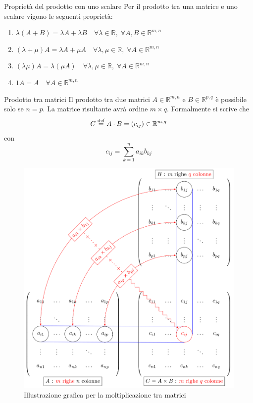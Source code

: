 \begin{SubDef}{Proprietà del prodotto con uno scalare}
  Per il prodotto tra una matrice e uno scalare vigono le seguenti proprietà:
  \begin{enumerate}
    \item $\lambda(A+B) = \lambda A + \lambda B\quad\forall\lambda\in\mathbb{R},\;
      \forall A,B\in\mathbb{R}^{m,n}$
    \item $(\lambda+\mu)A = \lambda A + \mu A\quad\forall\lambda,\mu\in\mathbb{R},\;
      \forall A\in\mathbb{R}^{m,n}$
    \item $(\lambda\mu)A = \lambda(\mu A)\quad\forall\lambda,\mu\in\mathbb{R},\;
      \forall A\in\mathbb{R}^{m,n}$
    \item $1A = A\quad\forall A\in\mathbb{R}^{m,n}$
  \end{enumerate}
\end{SubDef}

\begin{Def}{Prodotto tra matrici}\label{def:matrice_prodotto}
  Il prodotto tra due matrici $A\in\mathbb{R}^{m,n}$ e $B\in\mathbb{R}^{p,q}$ è
  possibile solo se $n=p$. La matrice risultante avrà ordine $m\times q$.
  Formalmente si scrive che
  \begin{equation*}
    C \overset{\text{def}}{=} A\cdot B = (c_{ij})\in\mathbb{R}^{m,q}
  \end{equation*}
  con
  \begin{equation*}
    c_{ij} = \sum^{n}_{k=1} a_{ik}b_{kj}
  \end{equation*}
  \begin{figure}[!htbp]
    \centering
    \includegraphics[width=0.6\linewidth]{images/matrMult.png}
    \caption{Illustrazione grafica per la moltiplicazione tra matrici}
    \label{fig:matrMult}
  \end{figure}
\end{Def}

